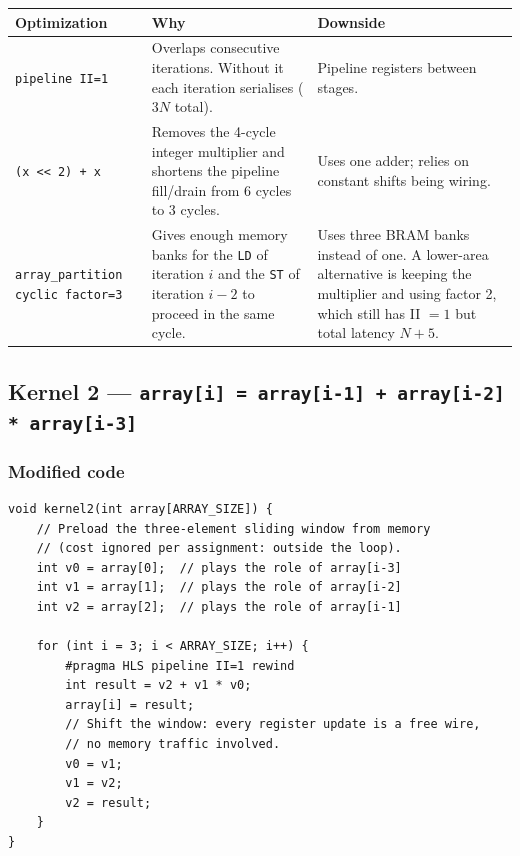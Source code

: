 \documentclass[11pt,a4paper]{article}
\begin{document}
\begin{center}
\begin{tabular}{p{3.2cm} p{6cm} p{5cm}}
\toprule
Optimization & Why & Downside \\
\midrule
\texttt{pipeline II=1} & Overlaps consecutive iterations. Without it each iteration serialises ($3N$ total). & Pipeline registers between stages. \\
\addlinespace
\texttt{(x \textless\textless\ 2) + x} & Removes the 4-cycle integer multiplier and shortens the pipeline fill/drain from 6 cycles to 3 cycles. & Uses one adder; relies on constant shifts being wiring. \\
\addlinespace
\texttt{array\_partition cyclic factor=3} & Gives enough memory banks for the \texttt{LD} of iteration $i$ and the \texttt{ST} of iteration $i-2$ to proceed in the same cycle. & Uses three BRAM banks instead of one. A lower-area alternative is keeping the multiplier and using factor 2, which still has II $=1$ but total latency $N+5$. \\
\bottomrule
\end{tabular}
\end{center}

\subsection{Kernel 2 --- \texttt{array[i] = array[i-1] + array[i-2] * array[i-3]}}

\subsubsection*{Modified code}

\begin{lstlisting}
void kernel2(int array[ARRAY_SIZE]) {
    // Preload the three-element sliding window from memory
    // (cost ignored per assignment: outside the loop).
    int v0 = array[0];  // plays the role of array[i-3]
    int v1 = array[1];  // plays the role of array[i-2]
    int v2 = array[2];  // plays the role of array[i-1]

    for (int i = 3; i < ARRAY_SIZE; i++) {
        #pragma HLS pipeline II=1 rewind
        int result = v2 + v1 * v0;
        array[i] = result;
        // Shift the window: every register update is a free wire,
        // no memory traffic involved.
        v0 = v1;
        v1 = v2;
        v2 = result;
    }
}
\end{lstlisting}
\end{document}
